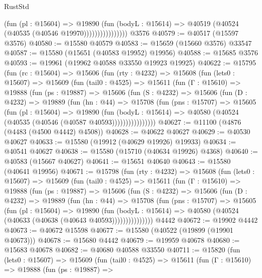 \begin{lexlean}{RustStd}
\begin{coremodule}
                          (fun (pl : @15604) =>
                          @19890
                            (fun (bodyL : @15614) =>
                            @40519 (@40524 (@40535 (@40546 @19970))))))))))))))))
    @3576
@40579 := @40517 (@15597 @3576)
@40580 := @15580 @40579
@40583 := @15659 (@15660 @3576) @33547
@40587 := @15580 (@15651 (@40583 @19952) @19956)
@40588 := @15685 @3576
@40593 := @19961 (@19962 @40588 @33550 @19923 @19925)
@40622 := @15795
    (fun (rc : @15604) =>
    @15606
      (fun (rty : @4232) =>
      @15608
        (fun (lets0 : @15607) =>
        @15609
          (fun (tail0 : @4525) =>
          @15611
            (fun (Γ : @15610) =>
            @19888
              (fun (ps : @19887) =>
              @15606
                (fun (S : @4232) =>
                @15606
                  (fun (D : @4232) =>
                  @19889
                    (fun (hn : @44) =>
                    @15708
                      (fun (pns : @15707) =>
                      @15605
                        (fun (pl : @15604) =>
                        @19890
                          (fun (bodyL : @15614) =>
                          @40580 (@40524 (@40535 (@40546 (@40587 @40593))))))))))))))))
@40627 := @11100 (@4876 (@4483 (@4500 @4442) @4508))
@40628 := @40622 @40627
@40629 := @40530 @40627
@40633 := @15580 (@19912 (@40629 @19926) @19933)
@40634 := @40541 @40627
@40638 := @15580 (@15710 (@40634 @19926) @4368)
@40640 := @40583 (@15667 @40627)
@40641 := @15651 @40640
@40643 := @15580 (@40641 @19956)
@40671 := @15798
    (fun (rty : @4232) =>
    @15608
      (fun (lets0 : @15607) =>
      @15609
        (fun (tail0 : @4525) =>
        @15611
          (fun (Γ : @15610) =>
          @19888
            (fun (ps : @19887) =>
            @15606
              (fun (S : @4232) =>
              @15606
                (fun (D : @4232) =>
                @19889
                  (fun (hn : @44) =>
                  @15708
                    (fun (pns : @15707) =>
                    @15605
                      (fun (pl : @15604) =>
                      @19890
                        (fun (bodyL : @15614) =>
                        @40580 (@40524 (@40633 (@40638 (@40643 @40593)))))))))))))))
    @4442
@40672 := @19902 @4442
@40673 := @40672 @15598
@40677 := @15580 (@40522 (@19899 (@19901 @40673)))
@40678 := @15680 @4442
@40679 := @19959 @40678
@40680 := @15683 @40678
@40682 := @40680 @40588 @33550
@40711 := @15820
    (fun (lets0 : @15607) =>
    @15609
      (fun (tail0 : @4525) =>
      @15611
        (fun (Γ : @15610) =>
        @19888
          (fun (ps : @19887) =>

\end{coremodule}
\end{lexlean}
